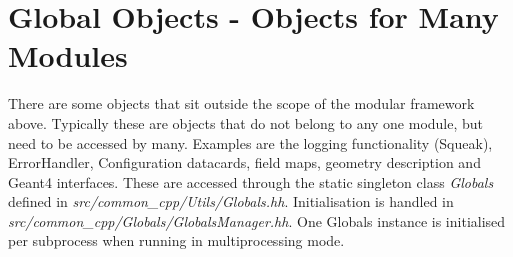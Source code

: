 \section{Global Objects - Objects for Many Modules}
There are some objects that sit outside the scope of the modular framework above. Typically these are objects that do not belong to any one module, but need to be accessed by many. Examples are the logging functionality (Squeak), ErrorHandler, Configuration datacards, field maps, geometry description and Geant4 interfaces. These are accessed through the static singleton class \emph{Globals} defined in \emph{src/common_cpp/Utils/Globals.hh}. Initialisation is handled in \emph{src/common_cpp/Globals/GlobalsManager.hh}. One Globals instance is initialised per subprocess when running in multiprocessing mode.


